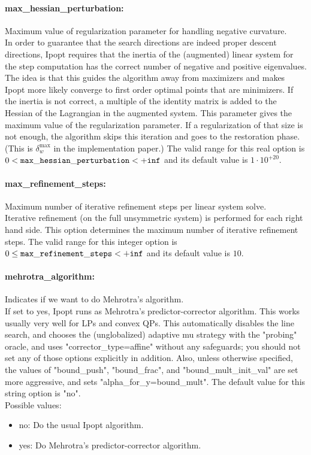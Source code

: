 \paragraph{max\_hessian\_perturbation:}\label{sec:max_hessian_perturbation} Maximum value of regularization parameter for handling negative curvature. $\;$ \\
 In order to guarantee that the search directions
are indeed proper descent directions, Ipopt
requires that the inertia of the (augmented)
linear system for the step computation has the
correct number of negative and positive
eigenvalues. The idea is that this guides the
algorithm away from maximizers and makes Ipopt
more likely converge to first order optimal
points that are minimizers. If the inertia is not
correct, a multiple of the identity matrix is
added to the Hessian of the Lagrangian in the
augmented system. This parameter gives the
maximum value of the regularization parameter. If
a regularization of that size is not enough, the
algorithm skips this iteration and goes to the
restoration phase. (This is $\delta_w^{\max}$ in the
implementation paper.) The valid range for this real option is 
$0 <  {\tt max\_hessian\_perturbation } <  {\tt +inf}$
and its default value is $1 \cdot 10^{+20}$.


\paragraph{max\_refinement\_steps:}\label{sec:max_refinement_steps} Maximum number of iterative refinement steps per linear system solve. $\;$ \\
 Iterative refinement (on the full unsymmetric
system) is performed for each right hand side. 
This option determines the maximum number of
iterative refinement steps. The valid range for this integer option is
$0 \le {\tt max\_refinement\_steps } <  {\tt +inf}$
and its default value is $10$.


\paragraph{mehrotra\_algorithm:}\label{sec:mehrotra_algorithm} Indicates if we want to do Mehrotra's algorithm. $\;$ \\
 If set to yes, Ipopt runs as Mehrotra's
predictor-corrector algorithm. This works usually
very well for LPs and convex QPs.  This
automatically disables the line search, and
chooses the (unglobalized) adaptive mu strategy
with the "probing" oracle, and uses
"corrector\_type=affine" without any safeguards;
you should not set any of those options
explicitly in addition.  Also, unless otherwise
specified, the values of "bound\_push",
"bound\_frac", and "bound\_mult\_init\_val" are
set more aggressive, and sets
"alpha\_for\_y=bound\_mult".
The default value for this string option is "no".
\\ 
Possible values:
\begin{itemize}
   \item no: Do the usual Ipopt algorithm.
   \item yes: Do Mehrotra's predictor-corrector algorithm.
\end{itemize}

